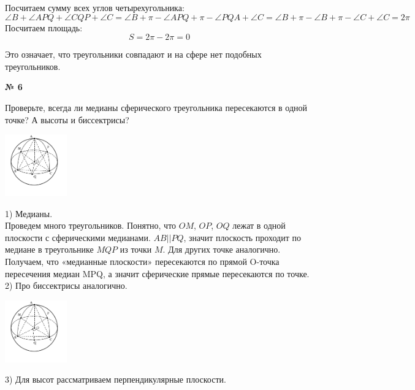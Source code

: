     Посчитаем сумму всех углов четырехугольника:
    \[
        \angle B + \angle APQ + \angle CQP + \angle C =
        \angle B + \pi - \angle APQ + \pi - \angle PQA + \angle C =
        \angle B + \pi - \angle B + \pi - \angle C + \angle C = 2\pi
    \]
    Посчитаем площадь:
    \[
        S = 2\pi - 2\pi = 0
    \]

    Это означает, что треугольники совпадают и на сфере нет подобных треугольников.

    \begin{center}
        \textbf{№ 6}
    \end{center}
    Проверьте, всегда ли медианы сферического треугольника пересекаются в одной точке?
    А высоты и биссектрисы?

    \begin{center}
        \includegraphics[width=0.2\textwidth]{images/Frame 73}\\
    \end{center}

    1) Медианы.\\

    Проведем много треугольников.
    Понятно, что $OM$, $OP$, $OQ$ лежат в одной плоскости с сферическими медианами.
    $AB || PQ$, значит плоскость проходит по медиане в треугольнике $MQP$ из точки $M$.
    Для других точке аналогично.
    Получаем, что «медианные плоскости» пересекаются по прямой O-точка пересечения медиан MPQ,
    а значит сферические прямые пересекаются по точке.\\

    2) Про биссектрисы аналогично.

    \begin{center}
        \includegraphics[width=0.2\textwidth]{images/Frame 74}\\
    \end{center}

    3) Для высот рассматриваем перпендикулярные плоскости.

